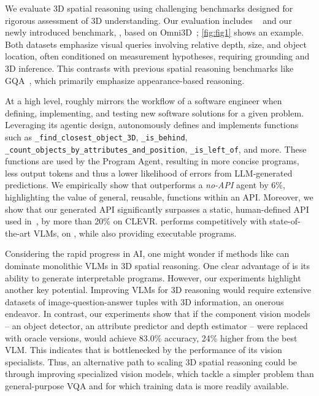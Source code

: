 We evaluate 3D spatial reasoning using challenging benchmarks designed for rigorous assessment of 3D understanding. Our evaluation includes \clevr~\cite{clevr} and our newly introduced benchmark, \ourbench, based on Omni3D~\cite{omni3d}; \cref{fig:fig1} shows an example. Both datasets emphasize visual queries involving relative depth, size, and object location, often conditioned on measurement hypotheses, requiring grounding and 3D inference. This contrasts with previous spatial reasoning benchmarks like GQA~\cite{gqa}, which primarily emphasize appearance-based reasoning.

At a high level, \method roughly mirrors the workflow of a software engineer when defining, implementing, and testing new software solutions for a given problem. Leveraging its agentic design, \method autonomously defines and implements functions such as \texttt{\_find\_closest\_object\_3D}, \texttt{\_is\_behind}, \texttt{\_count\_objects\_by\_attributes\_and\_position}, \texttt{\_is\_left\_of}, and more. These functions are used by the Program Agent, resulting in more concise programs, less output tokens and thus a lower likelihood of errors from LLM-generated predictions.
We empirically show that \method outperforms a \emph{no-API} agent by 6\%, highlighting the value of general, reusable, functions within an API.
Moreover, we show that our generated API significantly surpasses a static, human-defined API used in~\cite{visprog, vipergpt}, by more than 20\% on CLEVR.
\method performs competitively with state-of-the-art VLMs, on \ourbench, while also providing executable programs. 

Considering the rapid progress in AI, one might wonder if methods like \method can dominate monolithic VLMs in 3D spatial reasoning. One clear advantage of \method is its ability to generate interpretable programs. However, our experiments highlight another key potential. Improving VLMs for 3D reasoning would require extensive datasets of image-question-answer tuples with 3D information, an onerous endeavor. In contrast, our experiments show that if the component vision models -- an object detector, an attribute predictor and depth estimator -- were replaced with oracle versions, \method would achieve 83.0\% accuracy, 24\% higher from the best VLM.
This indicates that \method is bottlenecked by the performance of its vision specialists. Thus, an alternative path to scaling 3D spatial reasoning could be through improving specialized vision models, which tackle a simpler problem than general-purpose VQA and for which training data is more readily available. 

